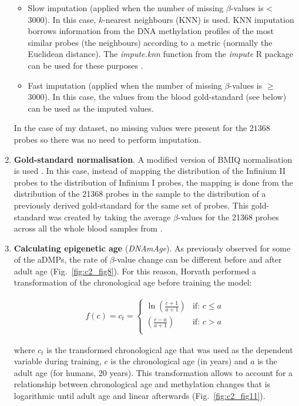 \begin{enumerate}
\begin{itemize}
		\item Slow imputation (applied when the number of missing $\beta$-values is < 3000). In this case, $k$-nearest neighbours (\acrshort{KNN}) is used. KNN imputation borrows information from the DNA methylation profiles of the most similar probes (the neighbours) according to a metric (normally the Euclidean distance). The \textit{impute.knn} function from the \textit{impute} R package can be used for these purposes \cite{Troyanskaya2001}.
		
		\item Fast imputation (applied when the number of missing $\beta$-values is $\geq$ 3000). In this case, the values from the blood gold-standard (see below) can be used as the imputed values.
		
	\end{itemize}
	
	In the case of my dataset, no missing values were present for the $21368$ probes so there was no need to perform imputation.
	
	\item \textbf{Gold-standard normalisation}. A modified version of BMIQ normalisation is used \cite{Teschendorff2012}. In this case, instead of mapping the distribution of the Infinium II probes to the distribution of Infinium I probes, the mapping is done from the distribution of the 21368 probes in the sample to the distribution of a previously derived gold-standard for the same set of probes. This gold-standard was created by taking the average $\beta$-values for the 21368 probes across all the whole blood samples from \cite{Horvath2012}.
	
	\item \textbf{Calculating epigenetic age} (\textit{DNAmAge}). As previously observed for some of the aDMPs, the rate of $\beta$-value change can be different before and after adult age (Fig.~\ref{fig:c2_fig8}). For this reason, Horvath performed a transformation of the chronological age before training the model:
	
	\begin{align}
	f(c) = c_t =  
	\begin{cases}
	\ln\left(\frac{c+1}{a+1}\right) &\text{if: } c\leq a \\
	\left(\frac{c-a}{a+1}\right) &\text{if: } c>a \\
	\end{cases}
	\end{align} 
	
	where $c_t$ is the transformed chronological age that was used as the dependent variable during training, $c$ is the chronological age (in years) and $a$ is the adult age (for humans, 20 years). This transformation allows to account for a relationship between chronological age and methylation changes that is logarithmic until adult age and linear afterwards (Fig.~\ref{fig:c2_fig11}). 
	

\end{enumerate}
